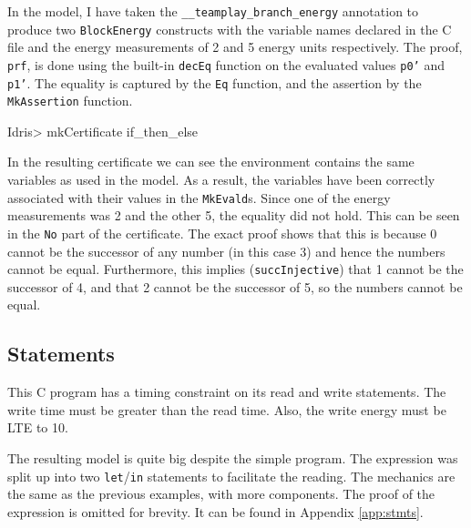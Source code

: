         \newpage
        
        
        In the model, I have taken the \texttt{\_\_teamplay\_branch\_energy} annotation to produce two \texttt{BlockEnergy} constructs with the variable names declared in the C file and the energy measurements of 2 and 5 energy units respectively. The proof, \texttt{prf}, is done using the built-in \texttt{decEq} function on the evaluated values \texttt{p0'} and \texttt{p1'}. The equality is captured by the \texttt{Eq} function, and the assertion by the \texttt{MkAssertion} function.
        
        \begin{code}
Idris> mkCertificate if_then_else
        \end{code}
        
        In the resulting certificate we can see the environment contains the same variables as used in the model. As a result, the variables have been correctly associated with their values in the \texttt{MkEvald}s. Since one of the energy measurements was 2 and the other 5, the equality did not hold. This can be seen in the \texttt{No} part of the certificate. The exact proof shows that this is because 0 cannot be the successor of any number (in this case 3) and hence the numbers cannot be equal. Furthermore, this implies (\texttt{succInjective}) that 1 cannot be the successor of 4, and that 2 cannot be the successor of 5, so the numbers cannot be equal.
        
    \subsection{Statements}\label{evaln:Statements}
        
        
        This C program has a timing constraint on its read and write statements. The write time must be greater than the read time. Also, the write energy must be LTE to 10.
        
        \newpage
        
        The resulting \Idris model is quite big despite the simple program. The expression was split up into two \texttt{let}/\texttt{in} statements to facilitate the reading. The mechanics are the same as the previous examples, with more components. The proof of the expression is omitted for brevity. It can be found in Appendix \ref{app:stmts}.

